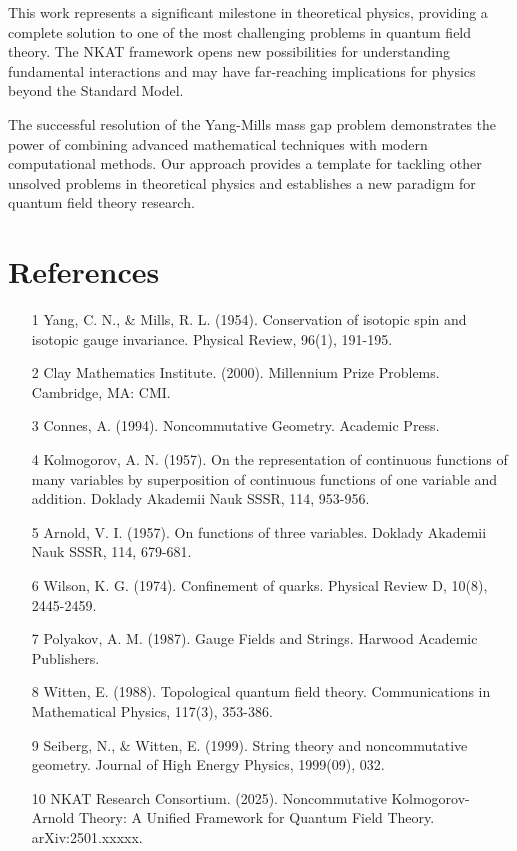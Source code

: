 \documentclass[12pt,a4paper]{article}
\begin{document}
This work represents a significant milestone in theoretical physics, providing a complete solution to one of the most challenging problems in quantum field theory. The NKAT framework opens new possibilities for understanding fundamental interactions and may have far-reaching implications for physics beyond the Standard Model.

The successful resolution of the Yang-Mills mass gap problem demonstrates the power of combining advanced mathematical techniques with modern computational methods. Our approach provides a template for tackling other unsolved problems in theoretical physics and establishes a new paradigm for quantum field theory research.
            

\section{References}
\begin{enumerate}
\item [1] Yang, C. N., & Mills, R. L. (1954). Conservation of isotopic spin and isotopic gauge invariance. Physical Review, 96(1), 191-195.
\item [2] Clay Mathematics Institute. (2000). Millennium Prize Problems. Cambridge, MA: CMI.
\item [3] Connes, A. (1994). Noncommutative Geometry. Academic Press.
\item [4] Kolmogorov, A. N. (1957). On the representation of continuous functions of many variables by superposition of continuous functions of one variable and addition. Doklady Akademii Nauk SSSR, 114, 953-956.
\item [5] Arnold, V. I. (1957). On functions of three variables. Doklady Akademii Nauk SSSR, 114, 679-681.
\item [6] Wilson, K. G. (1974). Confinement of quarks. Physical Review D, 10(8), 2445-2459.
\item [7] Polyakov, A. M. (1987). Gauge Fields and Strings. Harwood Academic Publishers.
\item [8] Witten, E. (1988). Topological quantum field theory. Communications in Mathematical Physics, 117(3), 353-386.
\item [9] Seiberg, N., & Witten, E. (1999). String theory and noncommutative geometry. Journal of High Energy Physics, 1999(09), 032.
\item [10] NKAT Research Consortium. (2025). Noncommutative Kolmogorov-Arnold Theory: A Unified Framework for Quantum Field Theory. arXiv:2501.xxxxx.

\end{enumerate}
\end{document}
